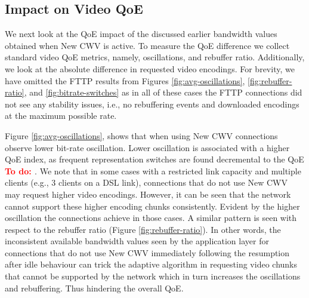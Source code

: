 \documentclass[10pt,sigconf,anonymous]{acmart}
\newcommand{\todo}[1]{\textbf{\textcolor{red}{To do: #1}}}
\begin{document}





\subsection{Impact on Video QoE}
\label{sec:QoE-impact}

We next look at the QoE impact of the discussed earlier bandwidth values obtained when New CWV is active. To measure the QoE difference we collect standard video QoE metrics, namely, oscillations, and rebuffer ratio. Additionally, we look at the absolute difference in requested video encodings. For brevity, we have omitted the FTTP results from Figures \ref{fig:avg-oscillations}, \ref{fig:rebuffer-ratio}, and \ref{fig:bitrate-switches} as in all of these cases the FTTP connections did not see any stability issues, i.e., no rebuffering events and downloaded encodings at the maximum possible rate.

Figure \ref{fig:avg-oscillations}, shows that when using New CWV connections observe lower bit-rate oscillation. Lower oscillation is associated with a higher QoE index, as frequent representation switches are found decremental to the QoE \todo{\cite{}}. We note that in some cases with a restricted link capacity and multiple clients (e.g., 3 clients on a DSL link), connections that do not use New CWV may request higher video encodings. However, it can be seen that the network cannot support these higher encoding chunks consistently. Evident by the higher oscillation the connections achieve in those cases. A similar pattern is seen with respect to the rebuffer ratio (Figure \ref{fig:rebuffer-ratio}). In other words, the inconsistent available bandwidth values seen by the application layer for connections that do not use New CWV immediately following the resumption after idle behaviour can trick the adaptive algorithm in requesting video chunks that cannot be supported by the network which in turn increases the oscillations and rebuffering. Thus hindering the overall QoE.
\end{document}
